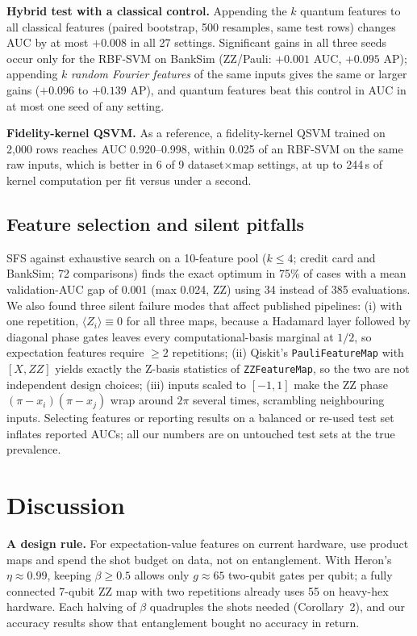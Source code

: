 \documentclass[conference,compsoc]{IEEEtran}
\newcommand{\ev}[1]{\langle #1\rangle}
\begin{document}
\textbf{Hybrid test with a classical control.} Appending the $k$ quantum features to all classical features (paired bootstrap, 500 resamples, same test rows) changes AUC by at most $+0.008$ in all 27 settings. Significant gains in all three seeds occur only for the RBF-SVM on BankSim (ZZ/Pauli: $+0.001$ AUC, $+0.095$ AP); appending $k$ \emph{random Fourier features} of the same inputs gives the same or larger gains ($+0.096$ to $+0.139$ AP), and quantum features beat this control in AUC in at most one seed of any setting.

\textbf{Fidelity-kernel QSVM.} As a reference, a fidelity-kernel QSVM trained on 2,000 rows reaches AUC 0.920--0.998, within 0.025 of an RBF-SVM on the same raw inputs, which is better in 6 of 9 dataset$\times$map settings, at up to 244\,s of kernel computation per fit versus under a second.

\subsection{Feature selection and silent pitfalls}
SFS against exhaustive search on a 10-feature pool ($k\le4$; credit card and BankSim; 72 comparisons) finds the exact optimum in 75\% of cases with a mean validation-AUC gap of 0.001 (max 0.024, ZZ) using 34 instead of 385 evaluations. We also found three silent failure modes that affect published pipelines: (i) with one repetition, $\ev{Z_i}\equiv0$ for all three maps, because a Hadamard layer followed by diagonal phase gates leaves every computational-basis marginal at $1/2$, so expectation features require $\ge2$ repetitions; (ii) Qiskit's \texttt{PauliFeatureMap} with $[X,ZZ]$ yields exactly the Z-basis statistics of \texttt{ZZFeatureMap}, so the two are not independent design choices; (iii) inputs scaled to $[-1,1]$ make the ZZ phase $(\pi-x_i)(\pi-x_j)$ wrap around $2\pi$ several times, scrambling neighbouring inputs. Selecting features or reporting results on a balanced or re-used test set inflates reported AUCs; all our numbers are on untouched test sets at the true prevalence.

\section{Discussion}
\textbf{A design rule.} For expectation-value features on current hardware, use product maps and spend the shot budget on data, not on entanglement. With Heron's $\eta\approx0.99$, keeping $\beta\ge0.5$ allows only $g\approx65$ two-qubit gates per qubit; a fully connected 7-qubit ZZ map with two repetitions already uses 55 on heavy-hex hardware. Each halving of $\beta$ quadruples the shots needed (Corollary~2), and our accuracy results show that entanglement bought no accuracy in return.
\end{document}
